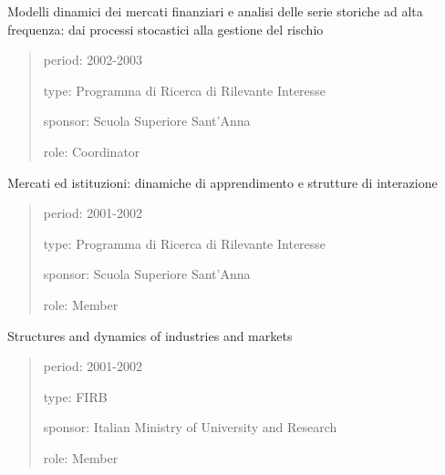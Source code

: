 \documentclass[a4paper]{article}
\newenvironment{DUfieldlist}%
    {\quote\description}
    {\enddescription\endquote}
\begin{document}
Modelli dinamici dei mercati finanziari e analisi delle serie storiche
ad alta frequenza: dai processi stocastici alla gestione del rischio
%
\begin{quote}
%
\begin{DUfieldlist}
\item[{period:}]
2002-2003

\item[{type:}]
Programma di Ricerca di Rilevante Interesse

\item[{sponsor:}]
Scuola Superiore Sant'Anna

\item[{role:}]
Coordinator

\end{DUfieldlist}

\end{quote}

Mercati ed istituzioni: dinamiche di apprendimento e strutture di
interazione
%
\begin{quote}
%
\begin{DUfieldlist}
\item[{period:}]
2001-2002

\item[{type:}]
Programma di Ricerca di Rilevante Interesse

\item[{sponsor:}]
Scuola Superiore Sant'Anna

\item[{role:}]
Member

\end{DUfieldlist}

\end{quote}

Structures and dynamics of industries and markets
%
\begin{quote}
%
\begin{DUfieldlist}
\item[{period:}]
2001-2002

\item[{type:}]
FIRB

\item[{sponsor:}]
Italian Ministry of University and Research

\item[{role:}]
Member

\end{DUfieldlist}

\end{quote}
\end{document}
